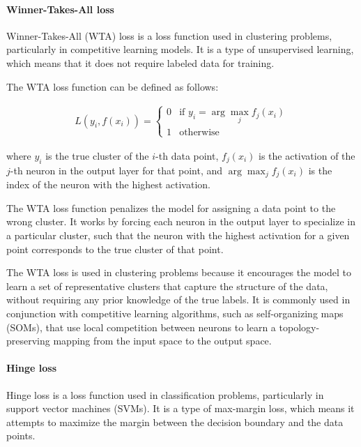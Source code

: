 \paragraph{Winner-Takes-All loss}
\label{par:3_WTA_loss}

Winner-Takes-All (WTA) loss is a loss function used in clustering problems, particularly in competitive learning models. It is a type of unsupervised learning, which means that it does not require labeled data for training.

The WTA loss function can be defined as follows:

\begin{equation}
\begin{split}
	L(y_i, f(x_i)) = \begin{cases}
		0 & \text{if } y_i = \arg\max_j f_j(x_i) \\
		1 & \text{otherwise} \
	\end{cases}
\end{split}
\end{equation}

where $y_i$ is the true cluster of the $i$-th data point, $f_j(x_i)$ is the activation of the $j$-th neuron in the output layer for that point, and $\arg\max_j f_j(x_i)$ is the index of the neuron with the highest activation.

The WTA loss function penalizes the model for assigning a data point to the wrong cluster. It works by forcing each neuron in the output layer to specialize in a particular cluster, such that the neuron with the highest activation for a given point corresponds to the true cluster of that point.

The WTA loss is used in clustering problems because it encourages the model to learn a set of representative clusters that capture the structure of the data, without requiring any prior knowledge of the true labels. It is commonly used in conjunction with competitive learning algorithms, such as self-organizing maps (SOMs), that use local competition between neurons to learn a topology-preserving mapping from the input space to the output space.

\paragraph{Hinge loss}
\label{par:3_hinge_loss}

Hinge loss is a loss function used in classification problems, particularly in support vector machines (SVMs). It is a type of max-margin loss, which means it attempts to maximize the margin between the decision boundary and the data points.

